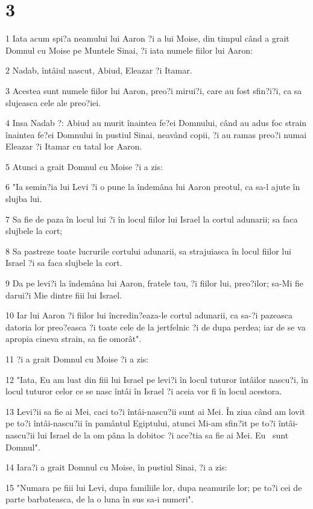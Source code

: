 \chapter{3}

\par 1 Iata acum spi?a neamului lui Aaron ?i a lui Moise, din timpul când a grait Domnul cu Moise pe Muntele Sinai, ?i iata numele fiilor lui Aaron:
\par 2 Nadab, întâiul nascut, Abiud, Eleazar ?i Itamar.
\par 3 Acestea sunt numele fiilor lui Aaron, preo?i mirui?i, care au fost sfin?i?i, ca sa slujeasca cele ale preo?iei.
\par 4 Insa Nadab ?: Abiud au murit înaintea fe?ei Domnului, când au adus foc strain înaintea fe?ei Domnului în pustiul Sinai, neavând copii, ?i au ramas preo?i numai Eleazar ?i Itamar cu tatal lor Aaron.
\par 5 Atunci a grait Domnul cu Moise ?i a zis:
\par 6 "Ia semin?ia lui Levi ?i o pune la îndemâna lui Aaron preotul, ca sa-l ajute în slujba lui.
\par 7 Sa fie de paza în locul lui ?i în locul fiilor lui Israel la cortul adunarii; sa faca slujbele la cort;
\par 8 Sa pastreze toate lucrurile cortului adunarii, sa strajuiasca în locul fiilor lui Israel ?i sa faca slujbele la cort.
\par 9 Da pe levi?i la îndemâna lui Aaron, fratele tau, ?i fiilor lui, preo?ilor; sa-Mi fie darui?i Mie dintre fiii lui Israel.
\par 10 Iar lui Aaron ?i fiilor lui încredin?eaza-le cortul adunarii, ca sa-?i pazeasca datoria lor preo?easca ?i toate cele de la jertfelnic ?i de dupa perdea; iar de se va apropia cineva strain, sa fie omorât".
\par 11 ?i a grait Domnul cu Moise ?i a zis:
\par 12 "Iata, Eu am luat din fiii lui Israel pe levi?i în locul tuturor întâilor nascu?i, în locul tuturor celor ce se nasc întâi în Israel ?i aceia vor fi în locul acestora.
\par 13 Levi?ii sa fie ai Mei, caci to?i întâi-nascu?ii sunt ai Mei. În ziua când am lovit pe to?i întâi-nascu?ii în pamântul Egiptului, atunci Mi-am sfin?it pe to?i întâi-nascu?ii lui Israel de la om pâna la dobitoc ?i ace?tia sa fie ai Mei. Eu  sunt Domnul".
\par 14 Iara?i a grait Domnul cu Moise, în pustiul Sinai, ?i a zis:
\par 15 "Numara pe fiii lui Levi, dupa familiile lor, dupa neamurile lor; pe to?i cei de parte barbateasca, de la o luna în sus sa-i numeri".
